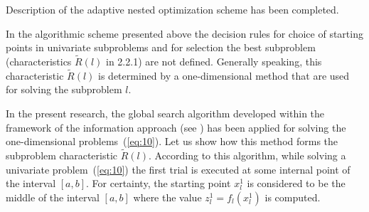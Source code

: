 \documentclass[smallextended]{svjour3}
\let\origref\ref
\renewcommand{\ref}[1]{(\origref{#1})}
\begin{document}
Description of the adaptive nested optimization scheme has been completed.

In the algorithmic scheme presented above the decision rules for choice of starting points in univariate subproblems and for selection the best subproblem (characteristics $\widetilde{R}(l)$ in 2.2.1) are not defined. Generally speaking, this characteristic $\widetilde{R}(l)$ is determined by a one-dimensional method that are used for solving the subproblem $l$.

In the present research, the global search algorithm developed within the framework of the information approach (see \cite{Ref34, Ref35, Ref36}) has been applied for solving the one-dimensional problems~\ref{eq:10}. Let us show how this method forms the subproblem characteristic $\widetilde{R}(l)$. According to this algorithm, while solving a univariate problem~\ref{eq:10} the first trial is executed at some internal point of the interval $[a, b]$. For certainty, the starting point $x_l^1$ is considered to be the middle of the interval $[a, b]$ where the value $z_l^1 = f_l(x_l^1)$ is computed.
\end{document}
